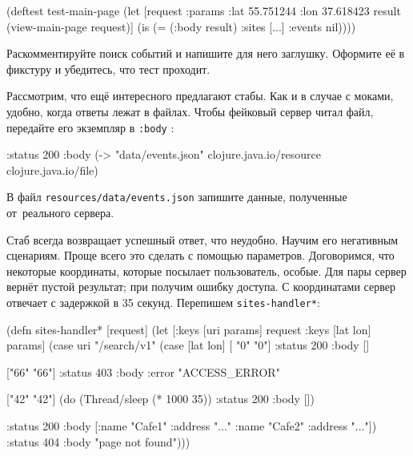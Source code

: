 \else

\begin{english}
  \begin{clojure}
(deftest test-main-page
  (let [request {:params {:lat 55.751244
                          :lon 37.618423}}
        result (view-main-page request)]
    (is (= (:body result) {:sites [...] :events nil}))))
  \end{clojure}
\end{english}

\fi

Раскомментируйте поиск событий и напишите для него заглушку. Оформите её в
фикстуру и убедитесь, что тест проходит.

Рассмотрим, что ещё интересного предлагают стабы. Как и в случае с моками,
удобно, когда ответы лежат в файлах. Чтобы фейковый сервер читал файл, передайте
его экземпляр в \verb|:body| :


\begin{english}
  \begin{clojure}
{:status 200
 :body (-> "data/events.json"
           clojure.java.io/resource
           clojure.java.io/file)}
  \end{clojure}
\end{english}

\noindent
В файл \verb|resources/data/events.json| запишите данные, полученные
от~реального сервера.


Стаб всегда возвращает успешный ответ, что неудобно. Научим его негативным
сценариям. Проще всего это сделать с помощью параметров. Договоримся, что
некоторые координаты, которые посылает пользователь, особые. Для пары 
сервер вернёт пустой результат; при  получим ошибку
доступа. С координатами  сервер отвечает с задержкой в 35
секунд. Перепишем \verb|sites-handler*|:

\ifx\devicetype\mobile

\begin{english}
  \begin{clojure}
(defn sites-handler* [request]
  (let [{:keys [uri params]} request
        {:keys [lat lon]} params]
    (case uri
      "/search/v1"
      (case [lat lon]
        [ "0"  "0"]
        {:status 200 :body []}

        ["66" "66"]
        {:status 403
         :body {:error "ACCESS_ERROR"}}

        ["42" "42"]
        (do (Thread/sleep (* 1000 35))
            {:status 200 :body []})

        {:status 200
         :body [{:name "Cafe1"
                 :address "..."}
                {:name "Cafe2"
                 :address "..."}]})
      {:status 404
       :body "page not found"})))
  \end{clojure}
\end{english}

